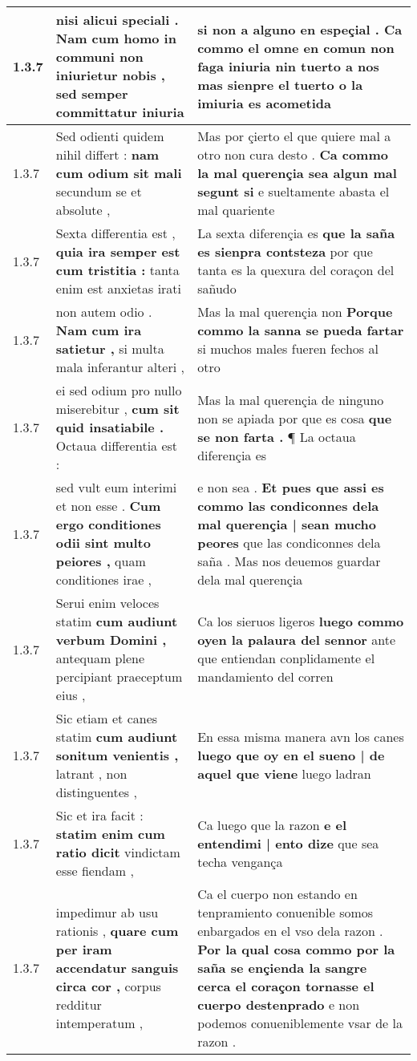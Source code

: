 \begin{tabular}{|p{1cm}|p{6.5cm}|p{6.5cm}|}
1.3.7 & nisi alicui speciali . \textbf{ Nam cum homo in communi non iniurietur nobis , } sed semper committatur iniuria & si non a alguno en espeçial . \textbf{ Ca commo el omne en comun non faga iniuria nin tuerto a nos } mas sienpre el tuerto o la imiuria es acometida \\\hline
1.3.7 & Sed odienti quidem nihil differt : \textbf{ nam cum odium sit mali } secundum se et absolute , & Mas por çierto el que quiere mal a otro non cura desto . \textbf{ Ca commo la mal querençia sea algun mal segunt si } e sueltamente abasta el mal quariente \\\hline
1.3.7 & Sexta differentia est , \textbf{ quia ira semper est cum tristitia : } tanta enim est anxietas irati & La sexta diferençia es \textbf{ que la saña es sienpra contsteza } por que tanta es la quexura del coraçon del sañudo \\\hline
1.3.7 & non autem odio . \textbf{ Nam cum ira satietur , } si multa mala inferantur alteri , & Mas la mal querençia non \textbf{ Porque commo la sanna se pueda fartar } si muchos males fueren fechos al otro \\\hline
1.3.7 & ei sed odium pro nullo miserebitur , \textbf{ cum sit quid insatiabile . } Octaua differentia est : & Mas la mal querençia de ninguno non se apiada por que es cosa \textbf{ que se non farta . } ¶ La octaua diferençia es \\\hline
1.3.7 & sed vult eum interimi et non esse . \textbf{ Cum ergo conditiones odii sint multo peiores , } quam conditiones irae , & e non sea . \textbf{ Et pues que assi es commo las condiconnes dela mal querençia | sean mucho peores } que las condiconnes dela saña . Mas nos deuemos guardar dela mal querençia \\\hline
1.3.7 & Serui enim veloces statim \textbf{ cum audiunt verbum Domini , } antequam plene percipiant praeceptum eius , & Ca los sieruos ligeros \textbf{ luego commo oyen la palaura del sennor } ante que entiendan conplidamente el mandamiento del corren \\\hline
1.3.7 & Sic etiam et canes statim \textbf{ cum audiunt sonitum venientis , } latrant , non distinguentes , & En essa misma manera avn los canes \textbf{ luego que oy en el sueno | de aquel que viene } luego ladran \\\hline
1.3.7 & Sic et ira facit : \textbf{ statim enim cum ratio dicit } vindictam esse fiendam , & Ca luego que la razon \textbf{ e el entendimi | ento dize } que sea techa vengança \\\hline
1.3.7 & impedimur ab usu rationis , \textbf{ quare cum per iram accendatur sanguis circa cor , } corpus redditur intemperatum , & Ca el cuerpo non estando en tenpramiento conuenible somos enbargados en el vso dela razon . \textbf{ Por la qual cosa commo por la saña se ençienda la sangre cerca el coraçon tornasse el cuerpo destenprado } e non podemos conueniblemente vsar de la razon . \\\hline

\end{tabular}
